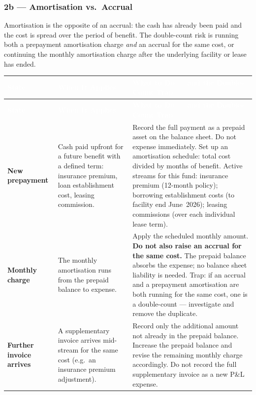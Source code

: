 \documentclass[10pt,a4paper]{article}
\begin{document}
\subsubsection{2b --- Amortisation vs.\ Accrual}
\label{sec:grp2b}

Amortisation is the opposite of an accrual: the cash has already been paid and the cost is spread over the period of benefit. The double-count risk is running both a prepayment amortisation charge \emph{and} an accrual for the same cost, or continuing the monthly amortisation charge after the underlying facility or lease has ended.

{\small\sffamily
\begin{longtable}{@{} L{2.0cm} L{3.0cm} L{7.7cm} @{}}
\textcolor{white}{\bfseries State} & \textcolor{white}{\bfseries When It Applies} & \textcolor{white}{\bfseries What to Do --- and the Double-Count Trap} \\
\midrule
\endfirsthead
{}\textcolor{white}{\bfseries State} & \textcolor{white}{\bfseries When It Applies} & \textcolor{white}{\bfseries What to Do --- and the Double-Count Trap} \\
\midrule
\endhead
\textbf{New prepayment} & Cash paid upfront for a future benefit with a defined term: insurance premium, loan establishment cost, leasing commission. & Record the full payment as a prepaid asset on the balance sheet. Do not expense immediately. Set up an amortisation schedule: total cost divided by months of benefit. Active streams for this fund: insurance premium (12-month policy); borrowing establishment costs (to facility end June~2026); leasing commissions (over each individual lease term). \\
\textbf{Monthly charge} & The monthly amortisation runs from the prepaid balance to expense. & Apply the scheduled monthly amount. \textbf{Do not also raise an accrual for the same cost.} The prepaid balance absorbs the expense; no balance sheet liability is needed. Trap: if an accrual and a prepayment amortisation are both running for the same cost, one is a double-count --- investigate and remove the duplicate. \\
\textbf{Further invoice arrives} & A supplementary invoice arrives mid-stream for the same cost (e.g.\ an insurance premium adjustment). & Record only the additional amount not already in the prepaid balance. Increase the prepaid balance and revise the remaining monthly charge accordingly. Do not record the full supplementary invoice as a new P\&L expense. \\

\end{longtable}}
\end{document}
